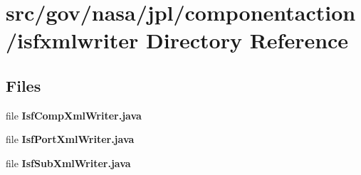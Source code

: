 \section{src/gov/nasa/jpl/componentaction/isfxmlwriter Directory Reference}
\label{dir_25234a01506c8890e144f3920b279b5f}
\subsection*{Files}
\begin{DoxyCompactItemize}
\item 
file {\bf Isf\+Comp\+Xml\+Writer.\+java}
\item 
file {\bf Isf\+Port\+Xml\+Writer.\+java}
\item 
file {\bf Isf\+Sub\+Xml\+Writer.\+java}
\end{DoxyCompactItemize}
